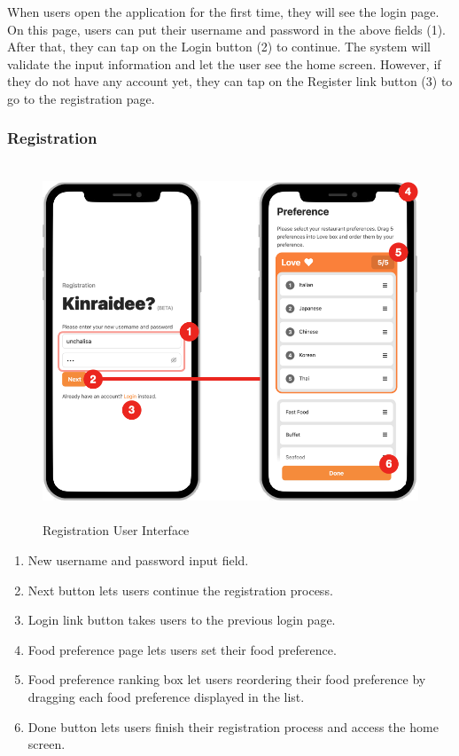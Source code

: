 \documentclass[12pt,oneside,openright,a4paper]{cpe-english-project}
\begin{document}
When users open the application for the first time, they will see the login page. On this page, users can put their username and password in the above fields (1). After that, they can tap on the Login button (2) to continue. The system will validate the input information and let the user see the home screen. However, if they do not have any account yet, they can tap on the Register link button (3) to go to the registration page.

\newpage
\subsubsection{Registration}
\begin{figure}[H]\centering
\includegraphics[height=300pt]{./images/4ui_RegistrationUserInterface.png}
\caption{Registration User Interface}\label{fig:4ui_RegistrationUserInterface}
\end{figure}\vspace{-24pt}

\begin{enumerate}
\item New username and password input field.
\item Next button lets users continue the registration process.
\item Login link button takes users to the previous login page.
\item Food preference page lets users set their food preference.
\item Food preference ranking box let users reordering their food preference by dragging each food preference displayed in the list.
\item Done button lets users finish their registration process and access the home screen.
\end{enumerate}
\end{document}
